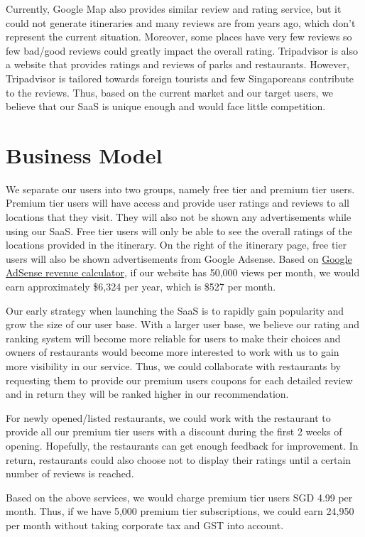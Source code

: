 \documentclass[12pt,a4paper]{article}
\begin{document}
Currently, Google Map also provides similar review and rating service, but it could not generate itineraries and many reviews are from years ago, which don't represent the current situation. Moreover, some places have very few reviews so few bad/good reviews could greatly impact the overall rating. Tripadvisor is also a website that provides ratings and reviews of parks and restaurants. However, Tripadvisor is tailored towards foreign tourists and few Singaporeans contribute to the reviews. Thus, based on the current market and our target users, we believe that our SaaS is unique enough and would face little competition.


\section{Business Model}

We separate our users into two groups, namely free tier and premium tier users. Premium tier users will have access and provide user ratings and reviews to all locations that they visit. They will also not be shown any advertisements while using our SaaS. Free tier users will only be able to see the overall ratings of the locations provided in the itinerary. On the right of the itinerary page, free tier users will also be shown advertisements from Google Adsense. Based on \href{https://www.google.com/adsense/start/#calculator}{Google AdSense revenue calculator}, if our website has 50,000 views per month, we would earn approximately \$6,324 per year, which is \$527 per month.

Our early strategy when launching the SaaS is to rapidly gain popularity and grow the size of our user base. With a larger user base, we believe our rating and ranking system will become more reliable for users to make their choices and owners of restaurants would become more interested to work with us to gain more visibility in our service. Thus, we could collaborate with restaurants by requesting them to provide our premium users coupons for each detailed review and in return they will be ranked higher in our recommendation.

For newly opened/listed restaurants, we could work with the restaurant to provide all our premium tier users with a discount during the first 2 weeks of opening. Hopefully, the restaurants can get enough feedback for improvement. In return, restaurants could also choose not to display their ratings until a certain number of reviews is reached.

Based on the above services, we would charge premium tier users SGD 4.99 per month. Thus, if we have 5,000 premium tier subscriptions, we could earn 24,950 per month without taking corporate tax and GST into account.
\end{document}
